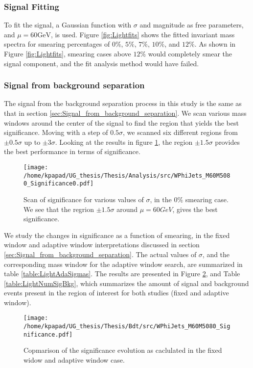 \subsubsection{Signal Fitting}
\label{sec:orgf4b823b}
\label{sec:Light_signal_fitting}
To fit the signal, a Gaussian function with \(\sigma\) and magnitude as free parameters, and \(\mu = 60\text{GeV}\), is used. Figure \ref{fig:Lightfits} shows the fitted invariant mass spectra for smearing percentages of \(0\%\), \(5\%\), \(7\%\), \(10\%\), and \(12\%\). As shown in Figure \ref{fig:Lightfits}, smearing cases above \(12\%\) would completely smear the signal component, and the fit analysis method would have failed.
\subsubsection{Signal from background separation}
\label{sec:org073f9f1}
\label{sec:Light_signal_from_background_separation}
The signal from the background separation process in this study is the same as that in section \ref{sec:Signal_from_background_separation}. We scan various mass windows around the center of the signal to find the region that yields the best significance. Moving with a step of \(0.5\sigma\), we scanned six different regions from \(\pm 0.5\sigma\) up to \(\pm 3\sigma\). Looking at the results in figure \ref{fig:LightScan0}, the region \(\pm 1.5\sigma\) provides the best performance in terms of significance.
\begin{figure}[h]
\centering
\texttt{[image: /home/kpapad/UG\_thesis/Thesis/Analysis/src/WPhiJets\_M60M5080\_Significance0.pdf]}
\caption{Scan of significance for various values of $\sigma$, in the $0\%$ smearing case. We see that the regrion $\pm 1.5\sigma$ around $\mu=60GeV$, gives the best significance.}
\label{fig:LightScan0}
\end{figure}

We study the changes in significance as a function of smearing, in the fixed window and adaptive window interpretations discussed in section \ref{sec:Signal_from_background_separation}. The actual values of \(\sigma\), and the corresponding mass window for the adaptive window search, are summarized in table \ref{table:LightAdaSigmas}. The results are presented in Figure \ref{fig:LightAdaFixedSig}, and Table \ref{table:LightNumSigBkg}, which summarizes the amount of signal and background events present in the region of interest for both studies (fixed and adaptive window).
\begin{figure}[h]
\centering
\texttt{[image: /home/kpapad/UG\_thesis/Thesis/Bdt/src/WPhiJets\_M60M5080\_Significance.pdf]}
\caption{Copmarison of the significance evolution as caclulated in the fixed widow and adaptive window case.} 
\label{fig:LightAdaFixedSig}
\end{figure}

